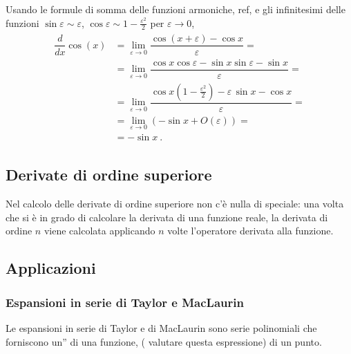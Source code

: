 \documentclass[letterpaper,10pt,italian]{jupyterBook}
\begin{document}
\sphinxAtStartPar
Usando le formule di somma delle funzioni armoniche,  ref, e gli infinitesimi delle funzioni \(\sin \varepsilon \sim \varepsilon\), \(\cos \varepsilon \sim 1 - \frac{\varepsilon^2}{2}\) per \(\varepsilon \rightarrow 0\),
\begin{equation*}
\begin{split}\begin{aligned}
  \dfrac{d}{dx} \cos(x) 
  & = \lim_{\varepsilon \rightarrow 0}  \dfrac{\cos(x+\varepsilon) - \cos x}{\varepsilon} = \\
  & = \lim_{\varepsilon \rightarrow 0} \dfrac{\cos x \cos \varepsilon - \sin x \sin \varepsilon - \sin x}{\varepsilon} = \\
  & = \lim_{\varepsilon \rightarrow 0} \dfrac{\cos x \left( 1 - \frac{\varepsilon^2}{2} \right) - \varepsilon \, \sin x - \cos x}{\varepsilon} = \\
  & = \lim_{\varepsilon \rightarrow 0} \left( - \sin x + O(\varepsilon) \right) = \\
  & = - \sin x \ .
\end{aligned}\end{split}
\end{equation*}

\subsection{Derivate di ordine superiore}
\label{\detokenize{ch/infinitesimal_calculus/derivatives:derivate-di-ordine-superiore}}\label{\detokenize{ch/infinitesimal_calculus/derivatives:infinitesimal-calculus-derivatives-higher}}
\sphinxAtStartPar
Nel calcolo delle derivate di ordine superiore non c’è nulla di speciale: una volta che si è in grado di calcolare la derivata di una funzione reale, la derivata di ordine \(n\) viene calcolata applicando \(n\) volte l’operatore derivata alla funzione.


\subsection{Applicazioni}
\label{\detokenize{ch/infinitesimal_calculus/derivatives:applicazioni}}\label{\detokenize{ch/infinitesimal_calculus/derivatives:infinitesimal-calculus-derivatives-applications}}

\subsubsection{Espansioni in serie di Taylor e MacLaurin}
\label{\detokenize{ch/infinitesimal_calculus/derivatives:espansioni-in-serie-di-taylor-e-maclaurin}}\label{\detokenize{ch/infinitesimal_calculus/derivatives:infinitesimal-calculus-derivatives-taylor}}
\sphinxAtStartPar
Le espansioni in serie di Taylor e di MacLaurin sono serie polinomiali che forniscono un” di una funzione,  ( valutare questa espressione) di un punto.
\end{document}
